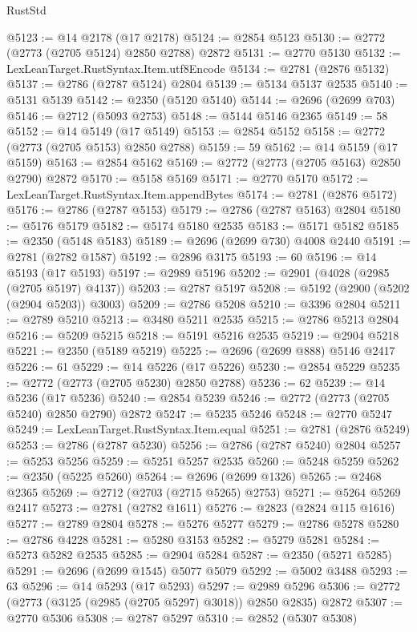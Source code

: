 \begin{lexlean}{RustStd}
\begin{coremodule}
@5123 := @14 @2178 (@17 @2178)
@5124 := @2854 @5123
@5130 := @2772 (@2773 (@2705 @5124) @2850 @2788) @2872
@5131 := @2770 @5130
@5132 := LexLeanTarget.RustSyntax.Item.utf8Encode
@5134 := @2781 (@2876 @5132)
@5137 := @2786 (@2787 @5124) @2804
@5139 := @5134 @5137 @2535
@5140 := @5131 @5139
@5142 := @2350 (@5120 @5140)
@5144 := @2696 (@2699 @703)
@5146 := @2712 (@5093 @2753)
@5148 := @5144 @5146 @2365
@5149 := 58
@5152 := @14 @5149 (@17 @5149)
@5153 := @2854 @5152
@5158 := @2772 (@2773 (@2705 @5153) @2850 @2788)
@5159 := 59
@5162 := @14 @5159 (@17 @5159)
@5163 := @2854 @5162
@5169 := @2772 (@2773 (@2705 @5163) @2850 @2790) @2872
@5170 := @5158 @5169
@5171 := @2770 @5170
@5172 := LexLeanTarget.RustSyntax.Item.appendBytes
@5174 := @2781 (@2876 @5172)
@5176 := @2786 (@2787 @5153)
@5179 := @2786 (@2787 @5163) @2804
@5180 := @5176 @5179
@5182 := @5174 @5180 @2535
@5183 := @5171 @5182
@5185 := @2350 (@5148 @5183)
@5189 := @2696 (@2699 @730) @4008 @2440
@5191 := @2781 (@2782 @1587)
@5192 := @2896 @3175
@5193 := 60
@5196 := @14 @5193 (@17 @5193)
@5197 := @2989 @5196
@5202 := @2901 (@4028 (@2985 (@2705 @5197) @4137))
@5203 := @2787 @5197
@5208 := @5192 (@2900 (@5202 (@2904 @5203)) @3003)
@5209 := @2786 @5208
@5210 := @3396 @2804
@5211 := @2789 @5210
@5213 := @3480 @5211 @2535
@5215 := @2786 @5213 @2804
@5216 := @5209 @5215
@5218 := @5191 @5216 @2535
@5219 := @2904 @5218
@5221 := @2350 (@5189 @5219)
@5225 := @2696 (@2699 @888) @5146 @2417
@5226 := 61
@5229 := @14 @5226 (@17 @5226)
@5230 := @2854 @5229
@5235 := @2772 (@2773 (@2705 @5230) @2850 @2788)
@5236 := 62
@5239 := @14 @5236 (@17 @5236)
@5240 := @2854 @5239
@5246 := @2772 (@2773 (@2705 @5240) @2850 @2790) @2872
@5247 := @5235 @5246
@5248 := @2770 @5247
@5249 := LexLeanTarget.RustSyntax.Item.equal
@5251 := @2781 (@2876 @5249)
@5253 := @2786 (@2787 @5230)
@5256 := @2786 (@2787 @5240) @2804
@5257 := @5253 @5256
@5259 := @5251 @5257 @2535
@5260 := @5248 @5259
@5262 := @2350 (@5225 @5260)
@5264 := @2696 (@2699 @1326)
@5265 := @2468 @2365
@5269 := @2712 (@2703 (@2715 @5265) @2753)
@5271 := @5264 @5269 @2417
@5273 := @2781 (@2782 @1611)
@5276 := @2823 (@2824 @115 @1616)
@5277 := @2789 @2804
@5278 := @5276 @5277
@5279 := @2786 @5278
@5280 := @2786 @4228
@5281 := @5280 @3153
@5282 := @5279 @5281
@5284 := @5273 @5282 @2535
@5285 := @2904 @5284
@5287 := @2350 (@5271 @5285)
@5291 := @2696 (@2699 @1545) @5077 @5079
@5292 := @5002 @3488
@5293 := 63
@5296 := @14 @5293 (@17 @5293)
@5297 := @2989 @5296
@5306 := @2772 (@2773 (@3125 (@2985 (@2705 @5297) @3018)) @2850 @2835) @2872
@5307 := @2770 @5306
@5308 := @2787 @5297
@5310 := @2852 (@5307 @5308)

\end{coremodule}
\end{lexlean}
